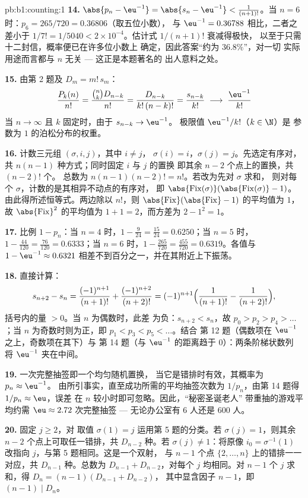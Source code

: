 \begin{solution}{pb:b1:counting:1}
\textbf{14.} $\abs{p_n - \eu^{-1}} = \abs{s_n - \eu^{-1}} <
\frac1{(n+1)!}$。当 $n = 6$ 时：$p_6 = 265/720 = 0.36806$（取五位小数），
与 $\eu^{-1} = 0.36788$ 相比，二者之差小于 $1/7! =
1/5040 < 2 \times 10^{-4}$。估计式 $1/(n+1)!$ 衰减得极快，
以至于只需十二封信，概率便已在许多位小数上
确定，因此答案“约为 $36.8\%$”，对一切
实际用途而言都与 $n$ 无关 --- 这正是本题著名的
出人意料之处。

\textbf{15.} 由第 2 题及 $D_m = m!\,s_m$：
\[
\frac{P_k(n)}{n!} = \frac{\binom nk D_{n-k}}{n!}
= \frac{D_{n-k}}{k!\,(n-k)!} = \frac{s_{n-k}}{k!}
\;\longrightarrow\; \frac{\eu^{-1}}{k!}
\]
当 $n \to \infty$ 且 $k$ 固定时，由于 $s_{n-k} \to \eu^{-1}$。
极限值 $\eu^{-1}/k!$（$k \in \N$）是
参数为 $1$ 的泊松分布的权重。

\textbf{16.} 计数三元组 $(\sigma, i, j)$，其中 $i \neq j$，
$\sigma(i) = i$，$\sigma(j) = j$。先选定有序对，
共 $n(n-1)$ 种方式；同时固定 $i$ 与 $j$ 的置换
即其余 $n - 2$ 个点上的置换，共 $(n-2)!$ 个。
总数为 $n(n-1)(n-2)! = n!$。若改为先对 $\sigma$ 求和，
则对每个 $\sigma$，计数的是其相异不动点的有序对，
即 $\abs{\mathrm{Fix}(\sigma)}(\abs{\mathrm{Fix}(\sigma)}-1)$。
由此得所述恒等式。两边除以 $n!$，则
$\abs{\mathrm{Fix}}(\abs{\mathrm{Fix}} - 1)$ 的平均值为 $1$，故
$\abs{\mathrm{Fix}}^2$ 的平均值为 $1 + 1 = 2$，而方差为 $2 -
1^2 = 1$。

\textbf{17.} 比例 $1 - p_n$：当 $n = 4$ 时，$1 - \frac
9{24} = \frac{15}{24} = 0.6250$；当 $n = 5$ 时，$1 - \frac{44}{120} =
\frac{76}{120} = 0.6333$；当 $n = 6$ 时，$1 - \frac{265}{720} =
\frac{455}{720} = 0.6319$。各值与 $1 - \eu^{-1}
\approx 0.6321$ 相差不到百分之一，并在其附近上下振荡。

\textbf{18.} 直接计算：
\[
s_{n+2} - s_n = \frac{(-1)^{n+1}}{(n+1)!} +
\frac{(-1)^{n+2}}{(n+2)!}
= (-1)^{n+1}\Bigl(\frac1{(n+1)!} - \frac1{(n+2)!}\Bigr),
\]
括号内的量 $> 0$。当 $n$ 为偶数时，此差
为负：$s_{n+2} < s_n$，故 $p_0 > p_2 > p_4 > \dots$；当 $n$
为奇数时则为正，即 $p_1 < p_3 < p_5 < \dots$。结合
第 12 题（偶数项在 $\eu^{-1}$ 之上，奇数项在其下）与
第 14 题（与 $\eu^{-1}$ 的距离趋于 $0$）：两条阶梯状数列
将 $\eu^{-1}$ 夹在中间。

\textbf{19.} 一次完整抽签即一个均匀随机置换，
当它是错排时有效，其概率为 $p_n \approx \eu^{-1}$。
由所引事实，直至成功所需的平均抽签次数为
$1/p_n$，由第 14 题得 $1/p_n \approx \eu$，误差
在 $n$ 较小时即可忽略。因此，“秘密圣诞老人”
带重抽的游戏平均约需 $\eu \approx 2.72$ 次完整抽签
--- 无论办公室有 $6$ 人还是 $600$ 人。

\textbf{20.} 固定 $j \geq 2$，对
取值 $\sigma(1) = j$ 运用第 5 题的分类。若 $\sigma(j) = 1$，则其余
$n - 2$ 个点上可取任一错排，共 $D_{n-2}$ 种。若
$\sigma(j) \neq 1$：将原像 $i_0 = \sigma^{-1}(1)$ 改指向
$j$，与第 5 题相同。这是一个双射，
与 $n - 1$ 个点 $\{2, \dots, n\}$ 上的错排一一对应，共 $D_{n-1}$
种。总数为 $D_{n-1} + D_{n-2}$，对每个 $j$ 均相同。对
$n - 1$ 个 $j$ 求和，得 $D_n = (n-1)(D_{n-1} + D_{n-2})$，
其中显含因子 $n - 1$，即 $(n-1) \mid D_n$。


\end{solution}
